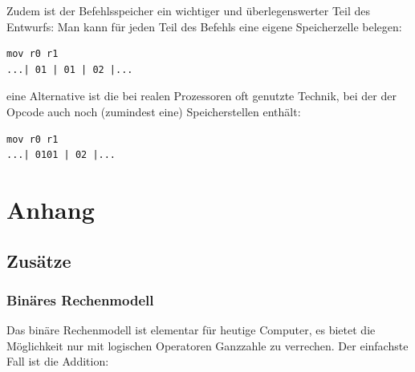 \documentclass[a4paper,12pt,oneside]{scrreprt}
\begin{document}
Zudem ist der Befehlsspeicher ein wichtiger und überlegenswerter Teil des Entwurfs:
Man kann für jeden Teil des Befehls eine eigene Speicherzelle belegen:
\begin{lstlisting}[frame=single]
mov r0 r1
...| 01 | 01 | 02 |...
\end{lstlisting}

eine Alternative ist die bei realen Prozessoren oft genutzte Technik, bei der der Opcode auch noch (zumindest eine) Speicherstellen enthält:

\begin{lstlisting}[frame=single]
mov r0 r1
...| 0101 | 02 |...
\end{lstlisting}

\part{Anhang}

\chapter{Zusätze}
\section{Binäres Rechenmodell}
\label{sec:calc_model}

Das binäre Rechenmodell ist elementar für heutige Computer, es bietet die Möglichkeit nur mit logischen Operatoren 
Ganzzahle zu verrechen. Der einfachste Fall ist die Addition:
\end{document}
